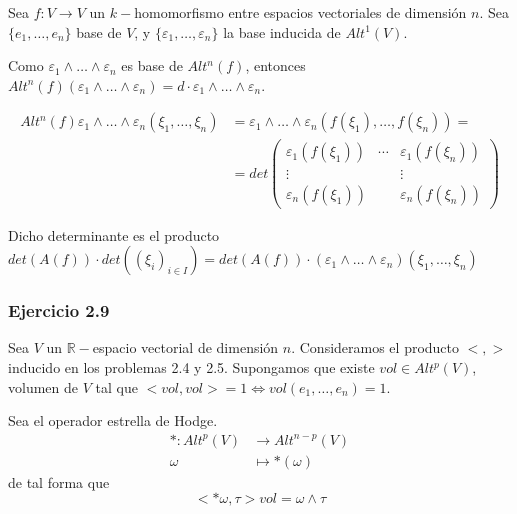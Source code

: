 Sea $f: V\rightarrow V$ un $k-$homomorfismo entre espacios vectoriales de dimensión $n$. Sea $\{e_1,\dots,e_n\}$ base de $V$, y $\{\varepsilon_1,\dots, \varepsilon_n\}$ la base inducida de $Alt^1(V)$. 

Como $\varepsilon_1\wedge \dots \wedge \varepsilon_n$ es base de $Alt^n(f)$, entonces $Alt^n(f)(\varepsilon_1\wedge \dots \wedge \varepsilon_n)=d\cdot \varepsilon_1 \wedge \dots \wedge  \varepsilon_n$.

\begin{equation}  
\begin{split}
    Alt^n(f)\varepsilon_1\wedge \dots \wedge \varepsilon_n (\xi_1,\dots,\xi_n) &= \varepsilon_1\wedge \dots \wedge \varepsilon_n (f(\xi_1),\dots,f(\xi_n)) = \\ 
&=det \left( \begin{array}{ccc}
\varepsilon_1(f(\xi_1)) & \cdots & \varepsilon_1(f(\xi_n)) \\
\vdots &  & \vdots \\
\varepsilon_n(f(\xi_1)) &  & \varepsilon_n(f(\xi_n)) \end{array} \right) 
\end{split}
\end{equation}

Dicho determinante es el producto $det(A(f))\cdot det((\xi_i)_{i\in I})=det(A(f))\cdot (\varepsilon_1\wedge \dots \wedge \varepsilon_n)(\xi_1,\dots,\xi_n)$

\subsubsection{Ejercicio 2.9}

Sea $V$ un $\mathbb{R}-$espacio vectorial de dimensión $n$. Consideramos el producto $<,>$ inducido en los problemas 2.4 y 2.5. Supongamos que existe $vol\in Alt^p(V)$, volumen de $V$ tal que $<vol,vol>=1 \Leftrightarrow vol(e_1,\dots,e_n)=1$. 

Sea el operador estrella de Hodge.
\begin{equation}
  \begin{split}
    *:Alt^p(V) &\rightarrow Alt^{n-p}(V) \\
    \omega &\mapsto *(\omega)
  \end{split}
\end{equation}
de tal forma que 
$$<*\omega , \tau >vol = \omega \wedge \tau $$

